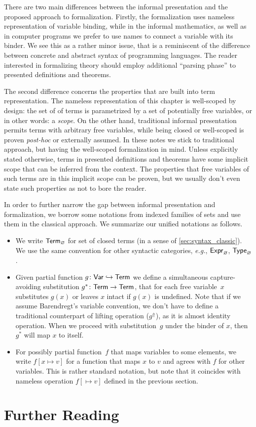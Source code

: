 There are two main differences between the informal presentation
and the proposed approach to formalization.
Firstly, the formalization uses nameless representation of variable
binding, while in the informal mathematics, as well as in computer programs
we prefer to use names to connect a variable with its binder.
We see this as a rather minor issue,
that is a reminiscent of the difference between concrete
and abstract syntax of programming languages.
The reader interested in formalizing theory should employ additional
``parsing phase'' to presented definitions and theorems.

The second difference concerns the properties that are built into
term representation.
The nameless representation of this chapter is well-scoped by design:
the set of of terms is parametrized by a set of potentially free variables,
or in other words: a \emph{scope}.
On the other hand,
traditional informal presentation permits terms with arbitrary
free variables,
while being closed or well-scoped is proven \emph{post-hoc}
or externally assumed.
In these notes we stick to traditional approach,
but having the well-scoped formalization in mind.
Unless explicitly stated otherwise,
terms in presented definitions and theorems have some implicit scope
that can be inferred from the context.
The properties that free variables of such terms are in this implicit scope
can be proven, but we usually don't even state such properties
as not to bore the reader.

In order to further narrow the gap between informal presentation
and formalization,
we borrow some notations from indexed families of sets and use them
in the classical approach.
We summarize our unified notations as follows.
\begin{itemize}
\item We write $\mathsf{Term}_\varnothing$ for set of closed terms
  (in a sense of \autoref{sec:syntax_classic}).
  We use the same convention for other syntactic categories,
  \emph{e.g.}, $\mathsf{Expr}_\varnothing$, $\mathsf{Type}_\varnothing$.
\item Given partial function $g\colon\mathsf{Var} \hookrightarrow \mathsf{Term}$
  we define a simultaneous capture-avoiding
  substitution $g^*\colon \mathsf{Term} \to \mathsf{Term}$,
  that for each free variable~$x$ substitutes $g(x)$
  or leaves $x$ intact if $g(x)$ is undefined.
  Note that if we assume Barendregt's variable convention,
  we don't have to define a traditional counterpart of
  lifting operation ($g^\Uparrow$), as it is almost identity operation.
  When we proceed with substitution~$g$ under the binder of $x$,
  then $g^*$ will map $x$ to itself.
\item For possibly partial function~$f$ that maps variables to some
  elements, we write $f[x\mapsto v]$ for a function that maps $x$ to $v$
  and agrees with $f$ for other variables.
  This is rather standard notation, but note that it coincides
  with nameless operation $f[\mapsto v]$ defined in the previous section.
\end{itemize}

\section{Further Reading}
